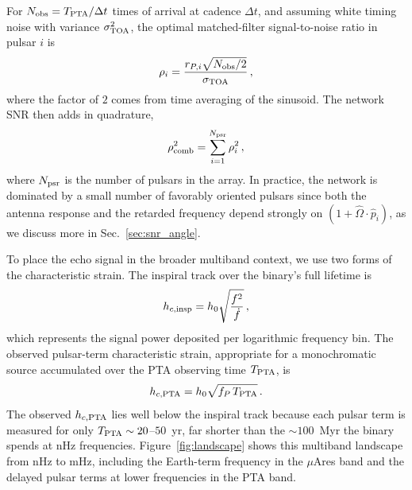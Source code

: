 \documentclass[aps,prx,twocolumn,superscriptaddress,nofootinbib,longbibliography]{revtex4-2}
\newcommand{\phat}{\hat{p}}
\newcommand{\Ohat}{\hat{\Omega}}
\begin{document}
For $N_{\rm obs}=T_{\rm PTA}/\Delta t$ times of arrival at cadence $\Delta t$, and assuming white timing noise with variance $\sigma_{\rm TOA}^2$, the optimal matched-filter signal-to-noise ratio in pulsar $i$ is~\cite{JK2012,MooreCB2015,HazbounRS2019}
\begin{equation}\label{eq:snr}
  \rho_i = \frac{r_{P,i}\sqrt{N_{\rm obs}/2}}{\sigma_{\rm TOA}}\,,
\end{equation}
where the factor of $2$ comes from time averaging of the sinusoid. The network SNR then adds in quadrature,
\begin{equation}\label{eq:snr_comb}
  \rho_{\rm comb}^2 = \sum_{i=1}^{N_{\rm psr}} \rho_i^2\,,
\end{equation}
where $N_{\rm psr}$ is the number of pulsars in the array. In practice, the network is dominated by a small number of favorably oriented pulsars since both the antenna response and the retarded frequency depend strongly on $(1+\Ohat\cdot\phat_i)$, as we discuss more in Sec.~\ref{sec:snr_angle}.

To place the echo signal in the broader multiband context, we use two forms of the characteristic strain. The inspiral track over the binary's full lifetime is~\cite{MooreCB2015}
\begin{equation}\label{eq:hc_inspiral}
  h_{c,\rm insp} = h_0\sqrt{\frac{f^2}{\dot{f}}}\,,
\end{equation}
which represents the signal power deposited per logarithmic frequency bin. The observed pulsar-term characteristic strain, appropriate for a monochromatic source accumulated over the PTA observing time $T_{\rm PTA}$, is~\cite{MooreCB2015}
\begin{equation}\label{eq:hc_pta}
  h_{c,\rm PTA} = h_0\sqrt{f_P\,T_{\rm PTA}}\,.
\end{equation}
The observed $h_{c,\rm PTA}$ lies well below the inspiral track because each pulsar term is measured for only $T_{\rm PTA} \sim 20$--$50$~yr, far shorter than the $\sim 100$~Myr the binary spends at nHz frequencies. Figure~\ref{fig:landscape} shows this multiband landscape from nHz to mHz, including the Earth-term frequency in the $\mu$Ares band and the delayed pulsar terms at lower frequencies in the PTA band.
\end{document}

